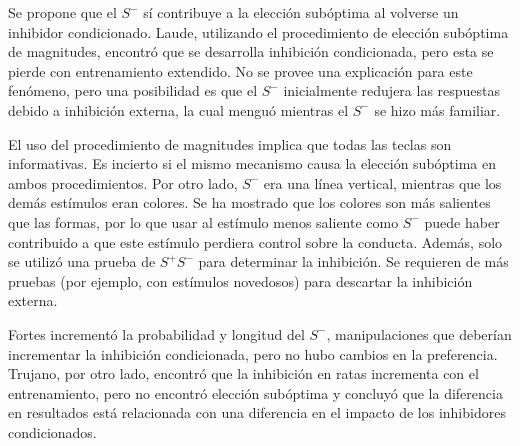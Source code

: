 \documentclass[a4paper,12pt]{article}
\begin{document}
Se propone que el $S^{-}$ sí contribuye a la elección subóptima al volverse un inhibidor condicionado.
Laude, utilizando el procedimiento de elección subóptima de magnitudes, encontró que se desarrolla inhibición condicionada, pero esta se pierde con entrenamiento extendido.
No se provee una explicación para este fenómeno, pero una posibilidad es que el $S^{-}$ inicialmente redujera las respuestas debido a inhibición externa, la cual menguó mientras el $S^{-}$ se hizo más familiar.

El uso del procedimiento de magnitudes implica que todas las teclas son informativas.
Es incierto si el mismo mecanismo causa la elección subóptima en ambos procedimientos.
Por otro lado, $S^{-}$ era una línea vertical, mientras que los demás estímulos eran colores.
Se ha mostrado que los colores son más salientes que las formas, por lo que usar al estímulo menos saliente como $S^{-}$ puede haber contribuido a que este estímulo perdiera control sobre la conducta.
Además, solo se utilizó una prueba de $S^{+}S^{-}$ para determinar la inhibición.
Se requieren de más pruebas (por ejemplo, con estímulos novedosos) para descartar la inhibición externa.

Fortes incrementó la probabilidad y longitud del $S^{-}$, manipulaciones que deberían incrementar la inhibición condicionada, pero no hubo cambios en la preferencia.
Trujano, por otro lado, encontró que la inhibición en ratas incrementa con el entrenamiento, pero no encontró elección subóptima y concluyó que la diferencia en resultados está relacionada con una diferencia en el impacto de los inhibidores condicionados.
\end{document}
